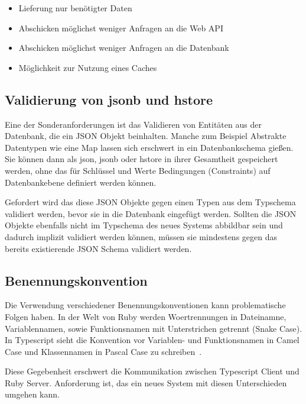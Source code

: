 \begin{itemize}
	\setlength\itemsep{-1em}
	\item Lieferung nur benötigter Daten
	\item Abschicken möglichst weniger Anfragen an die Web API
	\item Abschicken möglichst weniger Anfragen an die Datenbank
	\item Möglichkeit zur Nutzung eines Caches
\end{itemize}

\subsection{Validierung von jsonb und hstore}
\label{req:validation:json}
Eine der Sonderanforderungen ist das Validieren von Entitäten aus der Datenbank, die ein JSON Objekt beinhalten.
Manche zum Beispiel Abstrakte Datentypen wie eine Map lassen sich erschwert in ein Datenbankschema gießen. Sie können dann als json,
jsonb oder hstore in ihrer Gesamtheit gespeichert werden, ohne das für Schlüssel und Werte Bedingungen (Constraints) auf Datenbankebene definiert werden können.

Gefordert wird das diese JSON Objekte gegen einen Typen aus dem Typschema validiert werden, bevor sie in die Datenbank eingefügt werden. Sollten die JSON Objekte ebenfalls nicht im Typschema des neues Systems abbildbar sein und dadurch implizit validiert werden können, müssen sie mindestens gegen das bereits existierende JSON Schema validiert werden.

\subsection{Benennungskonvention}
Die Verwendung verschiedener Benennungskonventionen kann problematische Folgen haben.
In der Welt von Ruby werden Woertrennungen in Dateinamne, Variablennamen, sowie Funktionsnamen mit Unterstrichen getrennt (Snake Case).
In Typescript sieht die Konvention vor Variablen- und Funktionsnamen in Camel Case und Klassennamen in Pascal Case zu schreiben~\cite{typescript-conventions}.

Diese Gegebenheit erschwert die Kommunikation zwischen Typescript Client und Ruby Server. Anforderung ist, das ein neues System mit diesen Unterschieden umgehen kann.
